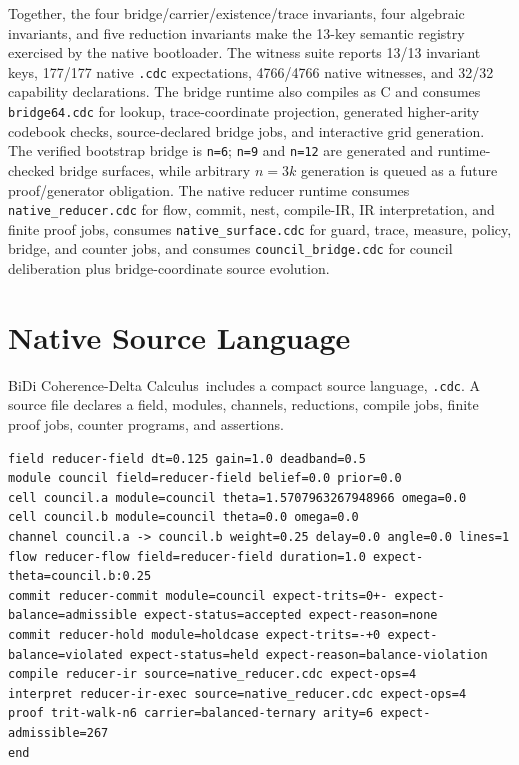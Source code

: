 \documentclass[11pt]{article}
\newcommand{\CDC}{BiDi Coherence-Delta Calculus}
\begin{document}
Together, the four bridge/carrier/existence/trace invariants, four algebraic
invariants, and five reduction invariants make the 13-key semantic registry
exercised by the native bootloader. The witness suite reports 13/13 invariant
keys, 177/177 native \texttt{.cdc} expectations, 4766/4766 native witnesses, and
32/32 capability declarations. The bridge runtime also compiles as C and consumes
\texttt{bridge64.cdc} for lookup, trace-coordinate projection, generated
higher-arity codebook checks, source-declared bridge jobs, and interactive grid
generation. The verified bootstrap bridge is \texttt{n=6}; \texttt{n=9} and
\texttt{n=12} are generated and runtime-checked bridge surfaces, while arbitrary
$n=3k$ generation is queued as a future proof/generator obligation. The native reducer runtime consumes \nolinkurl{native_reducer.cdc}
for flow, commit, nest, compile-IR, IR interpretation, and finite proof jobs,
consumes \nolinkurl{native_surface.cdc} for guard, trace, measure, policy,
bridge, and counter jobs,
and consumes \nolinkurl{council_bridge.cdc} for council deliberation plus
bridge-coordinate source evolution.

\section{Native Source Language}

\CDC\ includes a compact source language, \texttt{.cdc}. A source file declares a
field, modules, channels, reductions, compile jobs, finite proof jobs, counter
programs, and assertions.

\begin{lstlisting}[language={},caption={A small .cdc program.}]
field reducer-field dt=0.125 gain=1.0 deadband=0.5
module council field=reducer-field belief=0.0 prior=0.0
cell council.a module=council theta=1.5707963267948966 omega=0.0
cell council.b module=council theta=0.0 omega=0.0
channel council.a -> council.b weight=0.25 delay=0.0 angle=0.0 lines=1
flow reducer-flow field=reducer-field duration=1.0 expect-theta=council.b:0.25
commit reducer-commit module=council expect-trits=0+- expect-balance=admissible expect-status=accepted expect-reason=none
commit reducer-hold module=holdcase expect-trits=-+0 expect-balance=violated expect-status=held expect-reason=balance-violation
compile reducer-ir source=native_reducer.cdc expect-ops=4
interpret reducer-ir-exec source=native_reducer.cdc expect-ops=4
proof trit-walk-n6 carrier=balanced-ternary arity=6 expect-admissible=267
end
\end{lstlisting}
\end{document}

